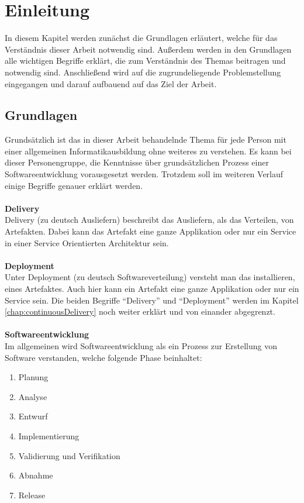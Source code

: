 \chapter{Einleitung}
\label{chap:einleitung}
In diesem Kapitel werden zunächst die Grundlagen erläutert, welche für das Verständnis dieser Arbeit notwendig sind. Außerdem werden in den Grundlagen alle wichtigen Begriffe erklärt, die zum Verständnis des Themas beitragen und notwendig sind. Anschließend wird auf die zugrundeliegende Problemstellung eingegangen und darauf aufbauend auf das Ziel der Arbeit.

\section{Grundlagen}
\label{sec:grundlagen}
Grundsätzlich ist das in dieser Arbeit behandelnde Thema für jede Person mit einer allgemeinen Informatikausbildung ohne weiteres zu verstehen. Es kann bei dieser Personengruppe, die Kenntnisse über grundsätzlichen Prozess einer Softwareentwicklung vorausgesetzt werden. Trotzdem soll im weiteren Verlauf einige Begriffe genauer erklärt werden.
\\\\
\textbf{Delivery}\\
Delivery (zu deutsch Ausliefern) beschreibt das Ausliefern, als das Verteilen, von Artefakten. Dabei kann das Artefakt eine ganze Applikation oder nur ein Service in einer Service Orientierten Architektur sein.
\\\\
\textbf{Deployment}\\
Unter Deployment (zu deutsch Softwareverteilung) versteht man das installieren, eines Artefaktes. Auch hier kann ein Artefakt eine ganze Applikation oder nur ein Service sein.  Die beiden Begriffe "`Delivery"' und "`Deployment"' werden im Kapitel \ref{chap:continuousDelivery}   noch weiter erklärt und von einander abgegrenzt.
\\\\
\textbf{Softwareentwicklung}\\
Im allgemeinen wird Softwareentwicklung als ein Prozess zur Erstellung von Software verstanden, welche folgende Phase beinhaltet:
\begin{enumerate}
	\item Planung
	\item Analyse
	\item Entwurf
	\item Implementierung
	\item Validierung und Verifikation
	\item Abnahme
	\item Release
\end{enumerate}
